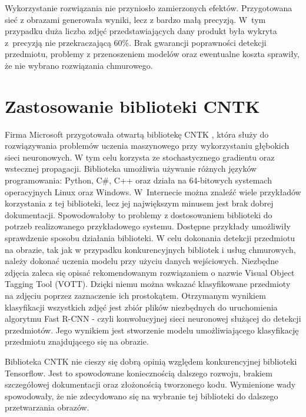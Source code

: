 {Wykorzystanie rozwiązania nie przyniosło zamierzonych efektów. Przygotowana sieć z obrazami generowała wyniki, lecz z bardzo małą precyzją. W~tym przypadku duża liczba zdjęć przedstawiających dany produkt była wykryta z~precyzją nie przekraczającą 60\%. Brak gwarancji poprawności detekcji przedmiotu, problemy z przenoszeniem modelów oraz ewentualne koszta sprawiły, że nie wybrano rozwiązania chmurowego.

\section{Zastosowanie biblioteki CNTK}{
Firma Microsoft przygotowała otwartą bibliotekę CNTK \cite{CNTK}, która służy do rozwiązywania problemów uczenia maszynowego przy wykorzystaniu głębokich sieci neuronowych. W tym celu korzysta ze stochastycznego gradientu oraz wstecznej propagacji. Biblioteka umożliwia używanie różnych języków programowania: Python, C\#, C++ oraz działa na 64-bitowych systemach operacyjnych Linux oraz Windows. W~Internecie można znaleźć wiele przykładów korzystania z tej biblioteki, lecz jej największym minusem jest brak dobrej dokumentacji. Spowodowałoby to problemy z dostosowaniem biblioteki do potrzeb realizowanego przykładowego systemu. Dostępne przykłady umożliwiły sprawdzenie sposobu działania biblioteki. W celu dokonania detekcji przedmiotu na obrazie, tak jak w przypadku konkurencyjnych bibliotek i usług chmurowych, należy dokonać uczenia modelu przy użyciu danych wejściowych. Niezbędne zdjęcia zaleca się opisać rekomendowanym rozwiązaniem o nazwie Visual Object Tagging Tool (VOTT)\cite{VOTT}. Dzięki niemu można wskazać klasyfikowane przedmioty na zdjęciu poprzez zaznaczenie ich prostokątem. Otrzymanym wynikiem klasyfikacji wszystkich zdjęć jest zbiór plików niezbędnych do uruchomienia algorytmu Fast R-CNN - czyli konwolucyjnej sieci neuronowej służącej do detekcji przedmiotów. Jego wynikiem jest stworzenie modelu umożliwiającego klasyfikację przedmiotu znajdującego się na obrazie. 

Biblioteka CNTK nie cieszy się dobrą opinią względem konkurencyjnej biblioteki Tensorflow. Jest to spowodowane koniecznością dalszego rozwoju, brakiem szczegółowej dokumentacji oraz złożonością tworzonego kodu. Wymienione wady spowodowały, że nie zdecydowano się na wybranie tej biblioteki do dalszego przetwarzania obrazów. 
}

}
